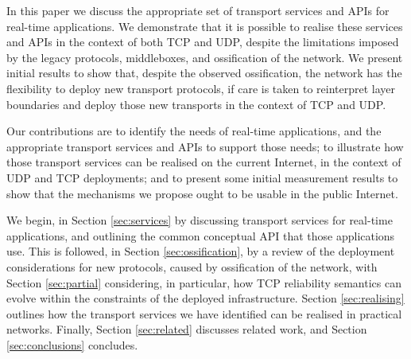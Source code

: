 \documentclass{sig-alternate-05-2015}
\begin{document}

In this paper we discuss the appropriate set of transport services and APIs
for real-time applications.
We demonstrate that it is possible to realise these services and APIs
in the context of both TCP and UDP, despite the limitations imposed by the
legacy protocols, middleboxes, and ossification of the network. 
We present initial results to show that, despite the observed ossification,
the network has the flexibility to deploy new transport protocols, if care
is taken to reinterpret layer boundaries and deploy those new transports in
the context of TCP and UDP.


Our contributions are to identify the needs of real-time applications, and
the appropriate transport services and APIs to support those needs; 
to illustrate how those transport services can be realised on the current
Internet, in the context of UDP and TCP deployments; and 
to present some initial measurement results to show that the mechanisms we
propose ought to be usable in the public Internet. 


We begin, in Section \ref{sec:services} by discussing transport services 
for real-time applications, and outlining the common conceptual API that
those applications use. 
This is followed, in Section \ref{sec:ossification}, by a review of the
deployment considerations for new protocols, caused by ossification of
the network, with Section \ref{sec:partial} considering, in particular, how
TCP reliability semantics can evolve within the constraints of the deployed
infrastructure.
Section \ref{sec:realising} outlines how the transport services we have
identified can be realised in practical networks.
Finally, Section \ref{sec:related} discusses related work, and Section
\ref{sec:conclusions} concludes.
\end{document}
